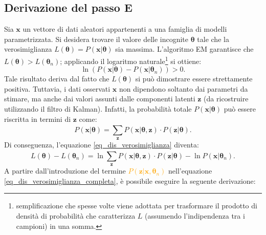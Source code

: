 \subsection{Derivazione del passo E}
Sia $\mathbf{x}$ un vettore di dati aleatori appartenenti a una famiglia di modelli parametrizzata. Si desidera trovare il valore delle incognite $\boldsymbol{\theta}$ tale che la verosimiglianza $L(\boldsymbol{\theta})=P(\mathbf{x} | \boldsymbol{\theta})$ sia massima. L'algoritmo EM garantisce che $L(\boldsymbol{\theta}) > L(\boldsymbol{\theta}_n)$; applicando il logaritmo naturale\footnote{semplificazione che spesse volte viene adottata per trasformare il prodotto di densità di probabilità che caratterizza $L$ (assumendo l'indipendenza tra i campioni) in una somma.} si ottiene:
\begin{equation}
	\ln(P(\mathbf{x}|\boldsymbol{\theta}) - P(\mathbf{x}|\boldsymbol{\theta}_n)) > 0.
	\label{eq_dis_verosimiglianza}
\end{equation}
Tale risultato deriva dal fatto che $L(\boldsymbol{\theta})$ si può dimostrare essere strettamente positiva. Tuttavia, i dati osservati $\mathbf{x}$ non dipendono soltanto dai parametri da stimare, ma anche dai valori assunti dalle componenti latenti $\mathbf{z}$ (da ricostruire utilizzando il filtro di Kalman). Infatti, la probabilità totale $P(\mathbf{x}|\boldsymbol{\theta})$ può essere riscritta in termini di $\mathbf{z}$ come:
\begin{equation}
	P(\mathbf{x}|\boldsymbol{\theta}) = \sum_{\mathbf{z}}^{}P(\mathbf{x}|\boldsymbol{\theta}, \mathbf{z})\cdot P(\mathbf{z}|\boldsymbol{\theta}).
\end{equation}
Di conseguenza, l'equazione \ref{eq_dis_verosimiglianza} diventa:
\begin{equation}
	L(\boldsymbol{\theta}) - L(\boldsymbol{\theta}_n) = \ln\sum_{\mathbf{z}}^{} P(\mathbf{x}|\boldsymbol{\theta}, \mathbf{z})\cdot P(\mathbf{z}|\boldsymbol{\theta}) - \ln P(\mathbf{x}|\boldsymbol{\theta}_n).
	\label{eq_dis_verosimiglianza_completa}
\end{equation}
A partire dall'introduzione del termine \textcolor{orange}{$P(\mathbf{z}|\mathbf{x},\boldsymbol{\theta}_n)$} nell'equazione \ref{eq_dis_verosimiglianza_completa}, è possibile eseguire la seguente derivazione:
